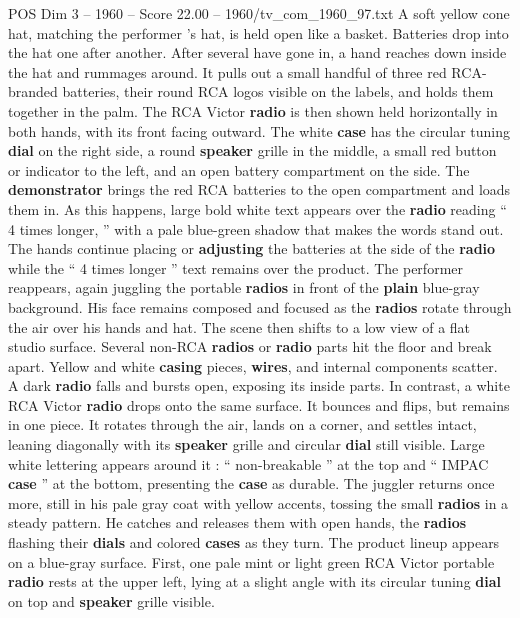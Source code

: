 \begin{textsample}{POS Dim 3 – 1960 – Score 22.00 – 1960/tv\_com\_1960\_97.txt}
A soft yellow cone hat, matching the performer ’s hat, is held open like a basket.
Batteries drop into the hat one after another.
After several have gone in, a hand reaches down inside the hat and rummages around.
It pulls out a small handful of three red RCA-branded batteries, their round RCA logos visible on the labels, and holds them together in the palm.
The RCA Victor \textbf{radio} is then shown held horizontally in both hands, with its front facing outward.
The white \textbf{case} has the circular tuning \textbf{dial} on the right side, a round \textbf{speaker} grille in the middle, a small red button or indicator to the left, and an open battery compartment on the side.
The \textbf{demonstrator} brings the red RCA batteries to the open compartment and loads them in.
As this happens, large bold white text appears over the \textbf{radio} reading “ 4 times longer, ” with a pale blue-green shadow that makes the words stand out.
The hands continue placing or \textbf{adjusting} the batteries at the side of the \textbf{radio} while the “ 4 times longer ” text remains over the product.
The performer reappears, again juggling the portable \textbf{radios} in front of the \textbf{plain} blue-gray background.
His face remains composed and focused as the \textbf{radios} rotate through the air over his hands and hat.
The scene then shifts to a low view of a flat studio surface.
Several non-RCA \textbf{radios} or \textbf{radio} parts hit the floor and break apart.
Yellow and white \textbf{casing} pieces, \textbf{wires}, and internal components scatter.
A dark \textbf{radio} falls and bursts open, exposing its inside parts.
In contrast, a white RCA Victor \textbf{radio} drops onto the same surface.
It bounces and flips, but remains in one piece.
It rotates through the air, lands on a corner, and settles intact, leaning diagonally with its \textbf{speaker} grille and circular \textbf{dial} still visible.
Large white lettering appears around it : “ non-breakable ” at the top and “ IMPAC \textbf{case} ” at the bottom, presenting the \textbf{case} as durable.
The juggler returns once more, still in his pale gray coat with yellow accents, tossing the small \textbf{radios} in a steady pattern.
He catches and releases them with open hands, the \textbf{radios} flashing their \textbf{dials} and colored \textbf{cases} as they turn.
The product lineup appears on a blue-gray surface.
First, one pale mint or light green RCA Victor portable \textbf{radio} rests at the upper left, lying at a slight angle with its circular tuning \textbf{dial} on top and \textbf{speaker} grille visible.

\end{textsample}
